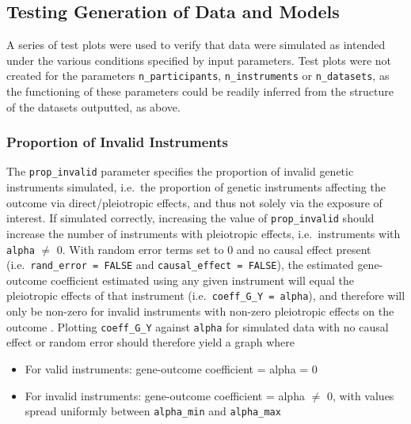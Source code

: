 \documentclass[
]{article}
\providecommand{\tightlist}{%
  \setlength{\itemsep}{0pt}\setlength{\parskip}{0pt}}
\begin{document}
\newpage

\subsection{Testing Generation of Data and Models}\label{appendix-sim-test}

A series of test plots were used to verify that data were simulated as intended under the various conditions specified by input parameters. Test plots were not created for the parameters \texttt{n\_participants}, \texttt{n\_instruments} or \texttt{n\_datasets}, as the functioning of these parameters could be readily inferred from the structure of the datasets outputted, as above.

\subsubsection{Proportion of Invalid Instruments}\label{proportion-of-invalid-instruments}

\leavevmode\newline The \texttt{prop\_invalid} parameter specifies the proportion of invalid genetic instruments simulated, i.e.~the proportion of genetic instruments affecting the outcome via direct/pleiotropic effects, and thus not solely via the exposure of interest. If simulated correctly, increasing the value of \texttt{prop\_invalid} should increase the number of instruments with pleiotropic effects, i.e.~instruments with \texttt{alpha} \(\ne\) 0. With random error terms set to 0 and no causal effect present (i.e.~\texttt{rand\_error\ =\ FALSE} and \texttt{causal\_effect\ =\ FALSE}), the estimated gene-outcome coefficient estimated using any given instrument will equal the pleiotropic effects of that instrument (i.e.~\texttt{coeff\_G\_Y\ =\ alpha}), and therefore will only be non-zero for invalid instruments with non-zero pleiotropic effects on the outcome . Plotting \texttt{coeff\_G\_Y} against \texttt{alpha} for simulated data with no causal effect or random error should therefore yield a graph where

\begin{itemize}
\tightlist
\item
  For valid instruments: gene-outcome coefficient = alpha = 0
\item
  For invalid instruments: gene-outcome coefficient = alpha \(\ne\) 0, with values spread uniformly between \texttt{alpha\_min} and \texttt{alpha\_max}
\end{itemize}
\end{document}
